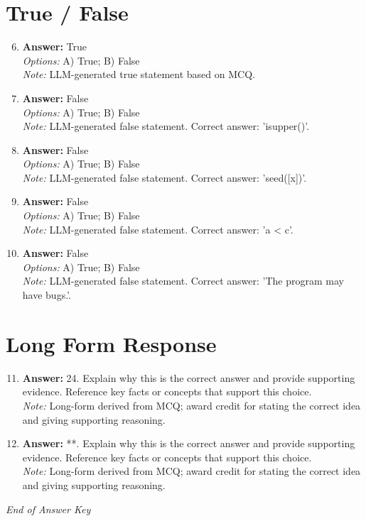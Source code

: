 \documentclass[12pt]{article}
\begin{document}
\section*{True / False}
\begin{enumerate}[label=\arabic*.]
\setcounter{enumi}{5}
\item \textbf{Answer:} True
\\ \textit{Options:} A) True; B) False
\\ \textit{Note:} LLM-generated true statement based on MCQ.
\item \textbf{Answer:} False
\\ \textit{Options:} A) True; B) False
\\ \textit{Note:} LLM-generated false statement. Correct answer: 'isupper()'.
\item \textbf{Answer:} False
\\ \textit{Options:} A) True; B) False
\\ \textit{Note:} LLM-generated false statement. Correct answer: 'seed([x])'.
\item \textbf{Answer:} False
\\ \textit{Options:} A) True; B) False
\\ \textit{Note:} LLM-generated false statement. Correct answer: 'a \textless{} c'.
\item \textbf{Answer:} False
\\ \textit{Options:} A) True; B) False
\\ \textit{Note:} LLM-generated false statement. Correct answer: 'The program may have bugs.'.
\end{enumerate}

\section*{Long Form Response}
\begin{enumerate}[label=\arabic*.]
\setcounter{enumi}{10}
\item \textbf{Answer:} 24. Explain why this is the correct answer and provide supporting evidence. Reference key facts or concepts that support this choice.
\\ \textit{Note:} Long-form derived from MCQ; award credit for stating the correct idea and giving supporting reasoning.
\item \textbf{Answer:} **. Explain why this is the correct answer and provide supporting evidence. Reference key facts or concepts that support this choice.
\\ \textit{Note:} Long-form derived from MCQ; award credit for stating the correct idea and giving supporting reasoning.
\end{enumerate}

\vfill
\noindent\textit{End of Answer Key}
\end{document}
